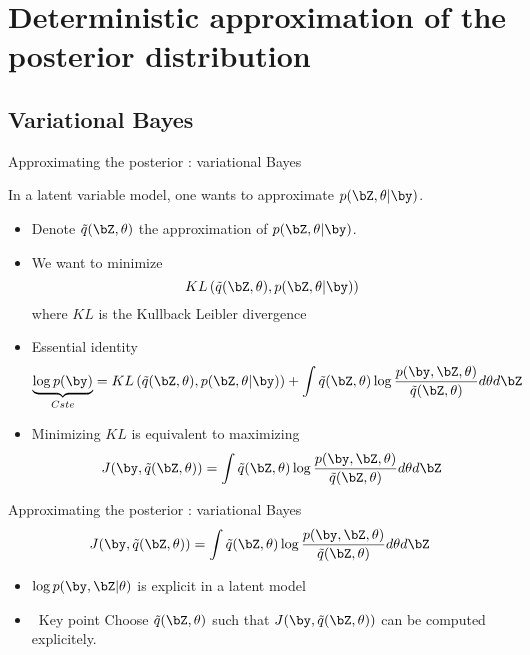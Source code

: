 \section[Deterministic approx.]{Deterministic approximation of the posterior distribution}


\subsection{Variational Bayes}

\begin{frame}{Approximating the posterior : variational Bayes}
 
In a latent variable model, one wants to approximate
$p(\bZ, \theta | \by)$. 

\begin{itemize}
 \item Denote $\tilde{q}(\bZ, \theta)$ the approximation of $p(\bZ, \theta | \by)$. 
 \item We want to minimize
 $$ KL\left(\tilde{q}(\bZ, \theta), p(\bZ, \theta | \by)\right)$$
 where $KL$ is the Kullback Leibler divergence
 \item \vert Essential identity \noir
 $$ \underbrace{\log p(\by)}_{Cste} = KL\left(\tilde{q}(\bZ, \theta), p(\bZ, \theta | \by)\right) + \int \tilde{q}(\bZ, \theta) \log \frac{p(\by, \bZ, \theta)}{\tilde{q}(\bZ, \theta)} d\theta d\bZ$$
 \item Minimizing  $KL$ is equivalent to maximizing $$J(\by,\tilde{q}(\bZ, \theta))  = \int \tilde{q}(\bZ, \theta) \log \frac{p(\by, \bZ, \theta)}{\tilde{q}(\bZ, \theta)} d\theta d\bZ$$ 
 
 
 \end{itemize}
\end{frame}

\begin{frame}{Approximating the posterior : variational Bayes}
$$J(\by,\tilde{q}(\bZ, \theta))  = \int \tilde{q}(\bZ, \theta) \log \frac{p(\by, \bZ, \theta)}{\tilde{q}(\bZ, \theta)} d\theta d\bZ$$ 

 \begin{itemize}
 \item $\log  p(\by, \bZ |  \theta) $ is explicit in a latent model
\item \vert \ Key point  \noir  Choose $\tilde{q}(\bZ, \theta)$ such that $J(\by,\tilde{q}(\bZ, \theta))$ can be computed explicitely. 
\end{itemize}
 
\end{frame}

